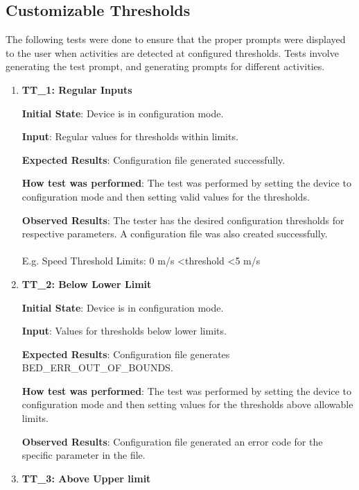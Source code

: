 \documentclass[12pt, titlepage]{article}
\begin{document}
\subsection{Customizable Thresholds}

The following tests were done to ensure that the proper prompts were displayed to the user when activities are detected at configured thresholds. Tests involve generating the test prompt, and generating prompts for different activities.

\begin{enumerate}
  \item{\textbf{TT\_1: Regular Inputs} \\}\label{TT1}

  \textbf{Initial State}: Device is in configuration mode.

  \textbf{Input}: Regular values for thresholds within limits.

  \textbf{Expected Results}: Configuration file generated successfully.

  \textbf{How test was performed}: The test was performed by setting the device to configuration mode and then setting valid values for the thresholds.

  \textbf{Observed Results}: The tester has the desired configuration thresholds for respective parameters. A configuration file was also created successfully. \\
  \\
	E.g. Speed Threshold Limits: 0 m/s \textless  threshold \textless 5 m/s

  \item{\textbf{TT\_2: Below Lower Limit} \\}\label{TT2}

  \textbf{Initial State}: Device is in configuration mode.

  \textbf{Input}: Values for thresholds below lower limits.

  \textbf{Expected Results}: Configuration file generates BED\_ERR\_OUT\_OF\_BOUNDS.

  \textbf{How test was performed}: The test was performed by setting the device to configuration mode and then setting values for the thresholds above allowable limits.

  \textbf{Observed Results}: Configuration file generated an error code for the specific parameter in the file.

  \item{\textbf{TT\_3: Above Upper limit }\\}\label{TT3}


\end{enumerate}
\end{document}
